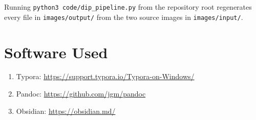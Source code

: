\documentclass[11pt,a4paper]{article}
\begin{document}
Running \texttt{python3 code/dip\_pipeline.py} from the repository root regenerates every file in \texttt{images/output/} from the two source images in \texttt{images/input/}.

\section{Software Used}

\begin{enumerate}
    \item Typora: \url{https://support.typora.io/Typora-on-Windows/}
    \item Pandoc: \url{https://github.com/jgm/pandoc}
    \item Obsidian: \url{https://obsidian.md/}
\end{enumerate}
\end{document}

